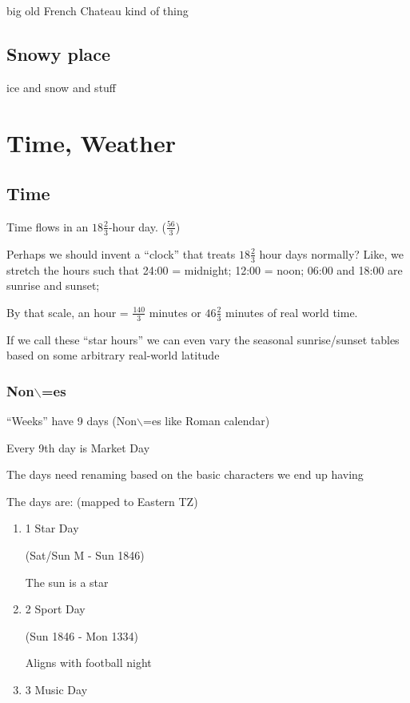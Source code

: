 \documentclass[11pt]{article}
\begin{document}
\begin{enumerate}
big old French Chateau kind of thing
\subsection{Snowy place}
\label{sec-4-9}

ice and snow and stuff
\section{Time, Weather}
\label{sec-5}

\subsection{Time}
\label{sec-5-1}

Time flows in an $18 \frac{2}{3}$-hour day. ($\frac{56}{3}$)

Perhaps we should invent a “clock” that treats $18 \frac{2}{3}$ hour
days normally?  Like, we stretch the hours such that 24:00 = midnight;
12:00 = noon; 06:00 and 18:00 are sunrise and sunset;

By that scale, an hour = $\frac{140}{3}$ minutes or $46 \frac{2}{3}$
minutes of real world time.

If  we  call  these  “star  hours”  we  can  even  vary  the  seasonal
sunrise/sunset tables based on some arbitrary real-world latitude

\subsubsection{Non$\backslash$=es}
\label{sec-5-1-1}

“Weeks” have 9 days (Non$\backslash$=es like Roman calendar)

Every 9th day is Market Day

The days need renaming based on the basic characters we end up having


The days are: (mapped to Eastern TZ)

\begin{enumerate}
\item 1 Star Day
\label{sec-5-1-1-1}

(Sat/Sun M - Sun 1846)

The sun is a star
\item 2 Sport Day
\label{sec-5-1-1-2}

(Sun 1846 - Mon 1334)

Aligns with football night
\item 3 Music Day
\label{sec-5-1-1-3}


\end{enumerate}
\end{enumerate}
\end{document}

